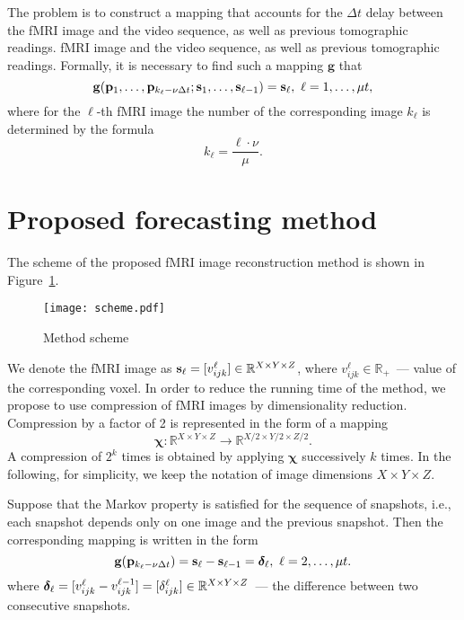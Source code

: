 \documentclass{article}
\begin{document}
The problem is to construct a mapping that accounts for the $\Delta t$ delay between the fMRI image and the video sequence, as well as previous tomographic readings.
fMRI image and the video sequence, as well as previous tomographic readings. Formally, it is necessary to
find such a mapping $\mathbf{g}$ that
\begin{equation}
	\label{eq3}
	\mathbf{g}(\mathbf{p}_1, \ldots, \mathbf{p}_{k_{\ell} - \nu \Delta t}; \mathbf{s}_1, \ldots, \mathbf{s}_{\ell-1}) = \mathbf{s}_{\ell},
	\ \ell = 1, \ldots, \mu t,
\end{equation}
where for the $\ell$-th fMRI image the number of the corresponding image $k_{\ell}$ is determined by the formula
\begin{equation}
	\label{eq4}
	k_{\ell} = \dfrac{\ell \cdot \nu}{\mu}.
\end{equation}

\section{Proposed forecasting method}

The scheme of the proposed fMRI image reconstruction method is shown in Figure~\ref{fig:scheme}. 

\begin{figure}[h!]
	\centering
	\texttt{[image: scheme.pdf]}
	\caption{Method scheme}
	\label{fig:scheme}
\end{figure}

We denote the fMRI image as $\mathbf{s}_{\ell} = [v^{\ell}_{ijk}] \in \mathbb{R}^{X \times Y \times Z}$,
where $v^{\ell}_{ijk} \in \mathbb{R}_+$~--- value of the corresponding voxel.
In order to reduce the running time of the method, we propose to use compression of fMRI images by dimensionality reduction.
Compression by a factor of 2 is represented in the form of a mapping
\[\bm{\chi}: \mathbb{R}^{X \times Y \times Z} \to \mathbb{R}^{X/2 \times Y/2 \times Z/2}.\]
A compression of $2^k$ times is obtained by applying $\bm{\chi}$ successively $k$ times. 
In the following, for simplicity, we keep the notation of image dimensions $X \times Y \times Z$.

Suppose that the Markov property is satisfied for the sequence of snapshots,
i.e., each snapshot depends only on one image and the previous snapshot.
Then the corresponding mapping is written in the form
\begin{equation}
	\label{eq5}
	\mathbf{g}(\mathbf{p}_{k_{\ell} - \nu \Delta t}) = \mathbf{s}_{\ell} - \mathbf{s}_{\ell-1} = \boldsymbol{\delta}_{\ell}, \ \ell = 2, \ldots, \mu t.
\end{equation}
where $\boldsymbol{\delta}_{\ell} = [v^{\ell}_{ijk} - v^{\ell-1}_{ijk}] = [\delta^{\ell}_{ijk}] \in \mathbb{R}^{X \times Y \times Z}$~--- the difference between two consecutive snapshots.
\end{document}
